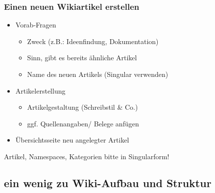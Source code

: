 \documentclass{beamer}
\begin{document}
\begin{frame}
  \frametitle{Einen neuen Wikiartikel erstellen}
  
  \begin{itemize}[<+->]
    \item Vorab-Fragen
    \begin{itemize}
      \item Zweck (z.B.: Ideenfindung, Dokumentation)
      \item Sinn, gibt es bereits ähnliche Artikel
      \item Name des neuen Artikels (Singular verwenden)
    \end{itemize}
    \item Artikelerstellung
    \begin{itemize}
      \item Artikelgestaltung (Schreibstil \& Co.)
      \item ggf. Quellenangaben/ Belege anfügen
    \end{itemize}
    \item Übersichtsseite neu angelegter Artikel
  \end{itemize}

  \onslide<+->
  
  Artikel, Namespaces, Kategorien bitte in Singularform!
\end{frame}

\subsection{ein wenig zu Wiki-Aufbau und Struktur}
\end{document}

